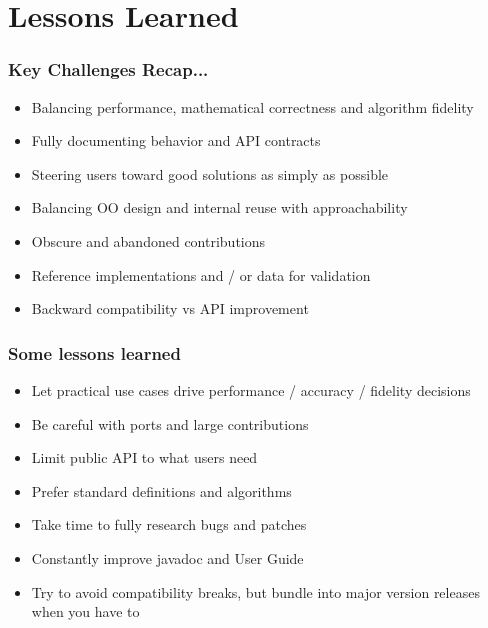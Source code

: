 \documentclass[14pt,mathserif]{beamer}
\begin{document}
\section[Getting involved]{Lessons Learned}
\begin{frame}
  \frametitle{Key Challenges Recap...}

\begin{small}
\begin{itemize}
\item Balancing performance, mathematical correctness and algorithm fidelity
\item Fully documenting behavior and API contracts
\item Steering users toward good solutions as simply as possible
\item Balancing OO design and internal reuse with approachability 
\item Obscure and abandoned contributions 
\item Reference implementations and / or data for validation
\item Backward compatibility vs API improvement
\end{itemize}
\end{small}
\end{frame}

\begin{frame}
  \frametitle{Some lessons learned}

\begin{small}
\begin{itemize}
\item Let practical use cases drive performance / accuracy / fidelity decisions
\item Be careful with ports and large contributions
\item Limit public API to what users need
\item Prefer standard definitions and algorithms
\item Take time to fully research bugs and patches
\item Constantly improve javadoc and User Guide
\item Try to avoid compatibility breaks, but bundle into major
version releases when you have to
\end{itemize}
\end{small}
\end{frame}
\end{document}
